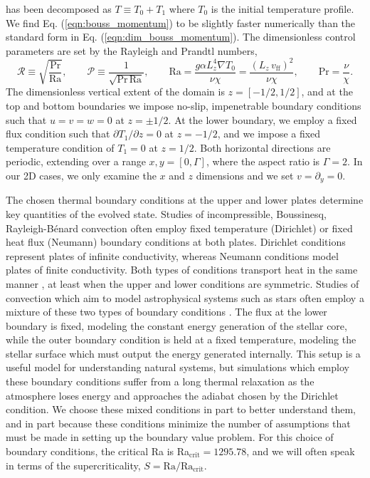 \documentclass[aps, pre, onecolumn, nofootinbib, notitlepage, groupedaddress, amsfonts, amssymb, amsmath, longbibliography]{revtex4-1}
\newcommand{\grad}{\ensuremath{\nabla}}
\newcommand{\RB}{Rayleigh-B\'{e}nard }
\begin{document}
has been decomposed as $T \equiv T_0 + T_1$ where $T_0$ is the initial temperature
profile. We find Eq. (\ref{eqn:bouss_momentum}) to
be slightly faster numerically than the standard form in Eq. (\ref{eqn:dim_bouss_momentum}).
The dimensionless control parameters are set by the Rayleigh and Prandtl numbers,
\begin{equation}
\mathcal{R} \equiv \sqrt{\frac{\text{Pr}}{\text{Ra}}}, \qquad \mathcal{P} \equiv \frac{1}{\sqrt{\text{Pr}\,\text{Ra}}}, \qquad
\text{Ra} = \frac{g \alpha L_z^4 \grad T_0}{\nu\chi} = \frac{(L_z\,v_{\text{ff}})^2}{\nu\chi}, \qquad \text{Pr} = \frac{\nu}{\chi}.
\end{equation}
The dimensionless vertical extent of the domain is $z = [-1/2, 1/2]$, and at the top and bottom boundaries
we impose no-slip, impenetrable boundary conditions such that $u = v = w = 0$ at $z = \pm 1/2$.
At the lower boundary, we employ a fixed flux condition such that $\partial T_1 / \partial z = 0$
at $z = -1/2$, and we impose a fixed temperature condition of $T_1 = 0$ at $z = 1/2$. Both
horizontal directions are periodic, extending over a range $x, y = [0, \Gamma]$, where
the aspect ratio is $\Gamma = 2$. In our 2D cases, we only examine the $x$ and $z$ dimensions
and we set $v = \partial_y = 0$.

The chosen thermal boundary conditions at the upper and lower plates
determine key quantities of the evolved state.
Studies of incompressible, Boussinesq, \RB convection often
employ fixed temperature (Dirichlet) or fixed heat flux
(Neumann) boundary conditions at both plates.  
Dirichlet conditions represent plates of infinite conductivity,
whereas Neumann conditions model plates of finite conductivity.  
Both types of conditions
transport heat in the same manner \cite{johnston&doering2009},
at least when the upper and lower conditions are symmetric.
Studies of convection which aim to model
astrophysical systems such as stars often employ a mixture of these
two types of boundary conditions \cite{hurlburt&all1984, cattaneo&all1991, korre&all2017}.  
The flux at the lower boundary is fixed, modeling
the constant energy generation of the stellar core, 
while the outer boundary condition is held at a fixed temperature,
modeling the stellar surface which must output the energy generated internally.
This setup is a useful model for understanding natural
systems, but simulations which employ these boundary conditions suffer from a long 
thermal relaxation as the atmosphere loses energy and approaches the adiabat chosen by the
Dirichlet condition.  We choose these mixed conditions in part to better understand them, and in
part because these conditions minimize the number of assumptions that must be made in
setting up the boundary value problem.  For this choice of boundary conditions, the
critical Ra is Ra$_{\text{crit}} = 1295.78$, and we will often speak in terms of the
supercriticality, $S = \text{Ra}/\text{Ra}_{\text{crit}}$.
\end{document}
